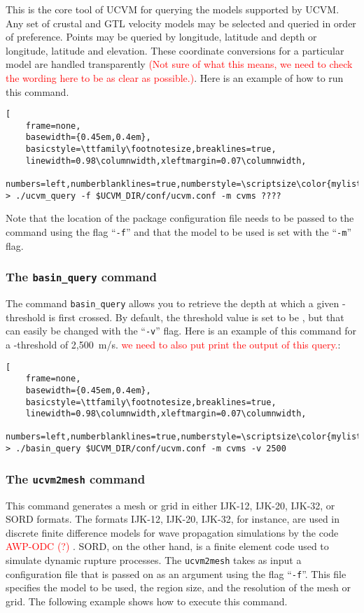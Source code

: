 This is the core tool of UCVM for querying the models supported by UCVM. Any set of crustal and GTL velocity models may be selected and queried in order of preference. Points may be queried by longitude, latitude and depth or longitude, latitude and elevation. These coordinate conversions for a particular model are handled transparently \textcolor{red}{(Not sure of what this means, we need to check the wording here to be as clear as possible.)}. Here is an example of how to run this command.

\begin{lstlisting}[
	frame=none,
	basewidth={0.45em,0.4em},
	basicstyle=\ttfamily\footnotesize,breaklines=true,
	linewidth=0.98\columnwidth,xleftmargin=0.07\columnwidth,
	numbers=left,numberblanklines=true,numberstyle=\scriptsize\color{mylistingnclr}]
> ./ucvm_query -f $UCVM_DIR/conf/ucvm.conf -m cvms ????
\end{lstlisting}

Note that the location of the package configuration file needs to be passed to the command using the flag ``\texttt{-f}'' and that the model to be used is set with the ``\texttt{-m}'' flag. 

\subsubsection{The \textup{\texttt{basin\_query}} command}

The command \texttt{basin\_query} allows you to retrieve the depth at which a given \vs{}-threshold is first crossed. By default, the threshold value is set to be , but that can easily be changed with the ``\texttt{-v}'' flag. Here is an example of this command for a \vs-threshold of 2,500~m/s. \textcolor{red}{we need to also put print the output of this query.}:

\begin{lstlisting}[
	frame=none,
	basewidth={0.45em,0.4em},
	basicstyle=\ttfamily\footnotesize,breaklines=true,
	linewidth=0.98\columnwidth,xleftmargin=0.07\columnwidth,
	numbers=left,numberblanklines=true,numberstyle=\scriptsize\color{mylistingnclr}]
> ./basin_query $UCVM_DIR/conf/ucvm.conf -m cvms -v 2500
\end{lstlisting}

\subsubsection{The \textup{\texttt{ucvm2mesh}} command}

This command generates a mesh or grid in either IJK-12, IJK-20, IJK-32, or SORD formats. The formats IJK-12, IJK-20, IJK-32, for instance, are used in discrete finite difference models for wave propagation simulations by the code \textcolor{red}{AWP-ODC (?) \citep{Cui_2010_SC}}. SORD, on the other hand, is a finite element code used to simulate dynamic rupture processes. The \texttt{ucvm2mesh} takes as input a configuration file that is passed on as an argument using the flag ``\texttt{-f}''. This file specifies the model to be used, the region size, and the resolution of the mesh or grid. The following example shows how to execute this command.

